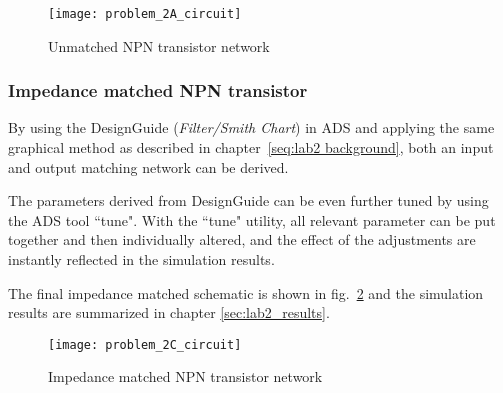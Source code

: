 \documentclass[report.tex]{subfiles}
\begin{document}
\begin{figure}[h]
    \centering
    \texttt{[image: problem\_2A\_circuit]}
    \caption{Unmatched NPN transistor network}
    \label{fig:problem 2A circuit}
\end{figure}

\subsubsection{Impedance matched NPN transistor}
By using the DesignGuide (\emph{Filter/Smith Chart}) in ADS and applying the same graphical method as described in chapter~\ref{seq:lab2 background}, both an input and output matching network can be derived.

The parameters derived from DesignGuide can be even further tuned by using the ADS tool ``tune". With the ``tune" utility, all relevant parameter can be put together and then individually altered, and the effect of the adjustments are instantly reflected in the simulation results.

The final impedance matched schematic is shown in fig.~\ref{fig:problem 2C circuit} and the simulation results are summarized in chapter \ref{sec:lab2_results}.

\begin{figure}[h]
    \centering
    \texttt{[image: problem\_2C\_circuit]}
    \caption{Impedance matched NPN transistor network}
    \label{fig:problem 2C circuit}
\end{figure}
\end{document}
